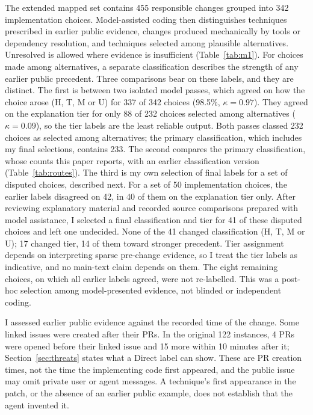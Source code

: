 \documentclass[acmsmall,screen,nonacm,review]{acmart}
\begin{document}
The extended mapped set contains 455 responsible changes grouped into 342 implementation choices. Model-assisted coding then distinguishes techniques prescribed in earlier public evidence, changes produced mechanically by tools or dependency resolution, and techniques selected among plausible alternatives. Unresolved is allowed where evidence is insufficient (Table~\ref{tab:m1}). For choices made among alternatives, a separate classification describes the strength of any earlier public precedent. Three comparisons bear on these labels, and they are distinct. The first is between two isolated model passes, which agreed on how the choice arose (H, T, M or U) for 337 of 342 choices (98.5\%, $\kappa=0.97$). They agreed on the explanation tier for only 88 of 232 choices selected among alternatives ($\kappa=0.09$), so the tier labels are the least reliable output. Both passes classed 232 choices as selected among alternatives; the primary classification, which includes my final selections, contains 233. The second compares the primary classification, whose counts this paper reports, with an earlier classification version (Table~\ref{tab:routes}). The third is my own selection of final labels for a set of disputed choices, described next. For a set of 50 implementation choices, the earlier labels disagreed on 42, in 40 of them on the explanation tier only. After reviewing explanatory material and recorded source comparisons prepared with model assistance, I selected a final classification and tier for 41 of these disputed choices and left one undecided. None of the 41 changed classification (H, T, M or U); 17 changed tier, 14 of them toward stronger precedent. Tier assignment depends on interpreting sparse pre-change evidence, so I treat the tier labels as indicative, and no main-text claim depends on them. The eight remaining choices, on which all earlier labels agreed, were not re-labelled. This was a post-hoc selection among model-presented evidence, not blinded or independent coding.

I assessed earlier public evidence against the recorded time of the change. Some linked issues were created after their PRs. In the original 122 instances, 4 PRs were opened before their linked issue and 15 more within 10 minutes after it; Section~\ref{sec:threats} states what a Direct label can show. These are PR creation times, not the time the implementing code first appeared, and the public issue may omit private user or agent messages. A technique's first appearance in the patch, or the absence of an earlier public example, does not establish that the agent invented it.
\end{document}
